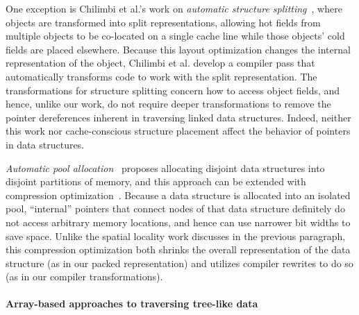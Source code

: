 One exception is Chilimbi et al.'s work on {\em automatic structure
splitting}~\cite{Chilimbi1999b}, where objects are transformed into split
representations, allowing hot fields from multiple objects to be co-located on
a single cache line while those objects' cold fields are placed elsewhere.
Because this layout optimization changes the internal representation of the
object, Chilimbi et al. develop a compiler pass that automatically transforms
code to work with the split representation. The transformations for structure
splitting concern how to access object fields, and hence, unlike our work, do
not require deeper transformations to remove the pointer dereferences inherent
in traversing linked data structures. Indeed, neither this work nor
cache-conscious structure placement affect the behavior of pointers in data
structures.

\emph{Automatic pool allocation}~\cite{Lattner2005} proposes
allocating disjoint data structures into disjoint partitions of
memory, and this approach can be extended with compression
optimization~\cite{Lattner2005mspc}. Because a data structure is
allocated into an isolated pool, ``internal'' pointers that connect
nodes of that data structure definitely do not access arbitrary memory
locations, and hence can use narrower bit widths to save space. Unlike
the spatial locality work discusses in the previous paragraph, this
compression optimization both shrinks the overall representation of
the data structure (as in our packed representation) and utilizes
compiler rewrites to do so (as in our compiler transformations).


\paragraph{Array-based approaches to traversing tree-like data}

